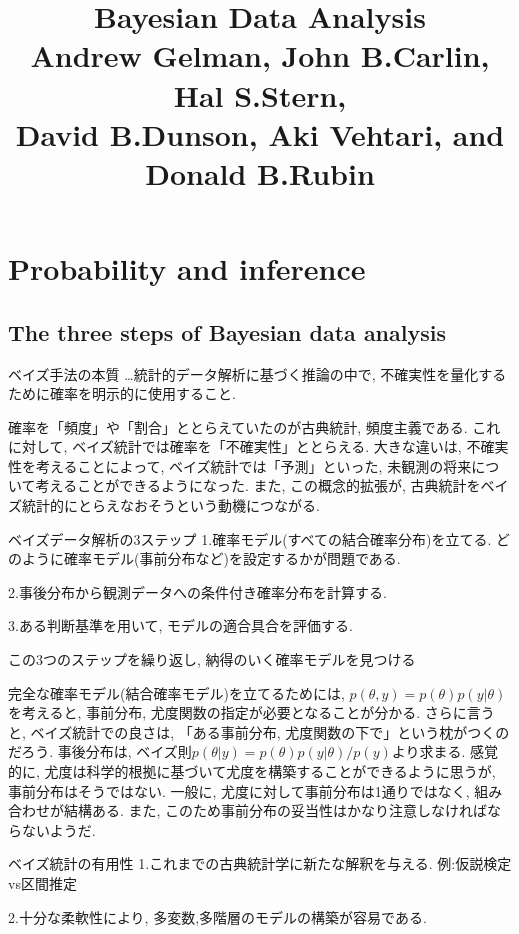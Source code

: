 \documentclass[11pt,a4pape,dvipdfmx]{jarticle}
\title{Bayesian Data Analysis\\Andrew Gelman, John B.Carlin, Hal S.Stern,\\David B.Dunson, Aki Vehtari, and Donald B.Rubin}
\begin{document}
\section{Probability and inference}

\subsection{The three steps of Bayesian data analysis}
\begin{itembox}[l]{ベイズ手法の本質}
…統計的データ解析に基づく推論の中で, 不確実性を量化するために確率を明示的に使用すること.
\end{itembox}

確率を「頻度」や「割合」ととらえていたのが古典統計, 頻度主義である.
これに対して, ベイズ統計では確率を「不確実性」ととらえる.
大きな違いは, 不確実性を考えることによって, ベイズ統計では「予測」といった, 未観測の将来について考えることができるようになった.
また, この概念的拡張が, 古典統計をベイズ統計的にとらえなおそうという動機につながる.


\begin{itembox}[l]{ベイズデータ解析の3ステップ}
1.確率モデル(すべての結合確率分布)を立てる.
どのように確率モデル(事前分布など)を設定するかが問題である.

2.事後分布から観測データへの条件付き確率分布を計算する.

3.ある判断基準を用いて, モデルの適合具合を評価する.

この3つのステップを繰り返し, 納得のいく確率モデルを見つける
\end{itembox}

完全な確率モデル(結合確率モデル)を立てるためには, $p(\theta,y)=p(\theta)p(y|\theta)$を考えると, 事前分布, 尤度関数の指定が必要となることが分かる.
さらに言うと, ベイズ統計での良さは, 「ある事前分布, 尤度関数の下で」という枕がつくのだろう.
事後分布は, ベイズ則$p(\theta|y)=p(\theta)p(y|\theta)/p(y)$より求まる.
感覚的に, 尤度は科学的根拠に基づいて尤度を構築することができるように思うが, 事前分布はそうではない.
一般に, 尤度に対して事前分布は1通りではなく, 組み合わせが結構ある.
また, このため事前分布の妥当性はかなり注意しなければならないようだ.


\begin{itembox}[l]{ベイズ統計の有用性}
1.これまでの古典統計学に新たな解釈を与える. 例:仮説検定vs区間推定

2.十分な柔軟性により, 多変数,多階層のモデルの構築が容易である.
\end{itembox}
\end{document}
